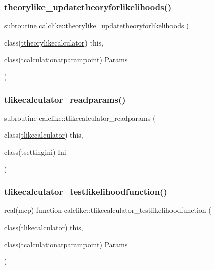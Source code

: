 \subsubsection{\texorpdfstring{theorylike\+\_\+updatetheoryforlikelihoods()}{theorylike\_updatetheoryforlikelihoods()}}
{\footnotesize\ttfamily subroutine calclike\+::theorylike\+\_\+updatetheoryforlikelihoods (\begin{DoxyParamCaption}\item[{class(\mbox{\hyperlink{structcalclike_1_1ttheorylikecalculator}{ttheorylikecalculator}})}]{this,  }\item[{class(tcalculationatparampoint)}]{Params }\end{DoxyParamCaption})\hspace{0.3cm}{\ttfamily [private]}}

\mbox{\label{namespacecalclike_af377ac1f0746c42a430094fe73246012}} 
\subsubsection{\texorpdfstring{tlikecalculator\+\_\+readparams()}{tlikecalculator\_readparams()}}
{\footnotesize\ttfamily subroutine calclike\+::tlikecalculator\+\_\+readparams (\begin{DoxyParamCaption}\item[{class(\mbox{\hyperlink{structcalclike_1_1tlikecalculator}{tlikecalculator}})}]{this,  }\item[{class(tsettingini)}]{Ini }\end{DoxyParamCaption})\hspace{0.3cm}{\ttfamily [private]}}

\mbox{\label{namespacecalclike_adb41feb15d07d744bace1629aea8a5d3}} 
\subsubsection{\texorpdfstring{tlikecalculator\+\_\+testlikelihoodfunction()}{tlikecalculator\_testlikelihoodfunction()}}
{\footnotesize\ttfamily real(mcp) function calclike\+::tlikecalculator\+\_\+testlikelihoodfunction (\begin{DoxyParamCaption}\item[{class(\mbox{\hyperlink{structcalclike_1_1tlikecalculator}{tlikecalculator}})}]{this,  }\item[{class(tcalculationatparampoint)}]{Params }\end{DoxyParamCaption})\hspace{0.3cm}{\ttfamily [private]}}

